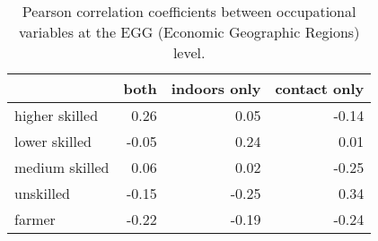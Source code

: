 \begin{table}

\caption{\label{tab:tab:occcor}Pearson correlation coefficients between occupational variables at the EGG (Economic Geographic Regions) level.}
\centering
\begin{tabular}[t]{l|r|r|r}
\hline
  & both & indoors only & contact only\\
\hline
higher skilled & 0.26 & 0.05 & -0.14\\
\hline
lower skilled & -0.05 & 0.24 & 0.01\\
\hline
medium skilled & 0.06 & 0.02 & -0.25\\
\hline
unskilled & -0.15 & -0.25 & 0.34\\
\hline
farmer & -0.22 & -0.19 & -0.24\\
\hline
\end{tabular}
\end{table}
